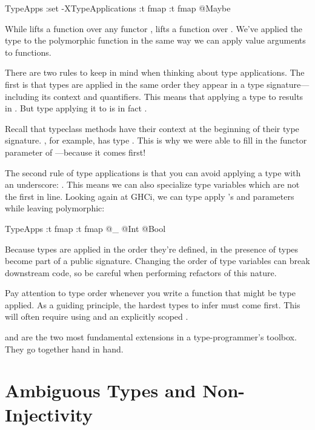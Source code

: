 \documentclass[book.tex]{subfiles}
\begin{document}
\begin{dorepl}{TypeApps}
:set -XTypeApplications
:t fmap
:t fmap @Maybe
\end{dorepl}

While  lifts a function over any functor , \;
lifts a function over . We've applied the type  to the
polymorphic function  in the same way we can apply value arguments to
functions.

There are two rules to keep in mind when thinking about type applications. The
first is that types are applied in the same order they appear in a type
signature---including its context and  quantifiers. This means that
applying a type  to  results in .
But type applying it to  is in fact .

Recall that typeclass methods have their context at the beginning of their type
signature. , for example, has type . This is why we were able to fill in the functor parameter of
---because it comes first!

The second rule of type applications is that you can avoid applying a type with
an underscore: . This means we can also specialize type variables which
are not the first in line. Looking again at GHCi, we can type apply 's
 and  parameters while leaving  polymorphic:

\begin{dorepl}{TypeApps}
:t fmap
:t fmap @_ @Int @Bool
\end{dorepl}

Because types are applied in the order they're defined, in the presence of
 types become part of a public signature. Changing the
order of type variables can break downstream code, so be careful when performing
refactors of this nature.

Pay attention to type order whenever you write a function that might be type
applied. As a guiding principle, the hardest types to infer must come first.
This will often require using  and an explicitly scoped
.

 and  are the two most
fundamental extensions in a type-programmer's toolbox. They go together hand in
hand.


\section{Ambiguous Types and Non-Injectivity}
\end{document}
